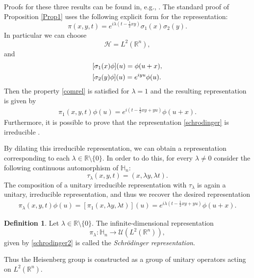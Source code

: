 \documentclass[12pt,oneside,a4paper]{book}
\numberwithin{equation}{section}     %
\theoremstyle{plain}
\theoremstyle{definition}
\newtheorem{definition}[theorem]{Definition}
\newcommand{\R}{{\mathbb R}}
\newcommand{\Rn}{{\R}^n}
\begin{document}
Proofs for these three results can be found in, e.g., \cite[Chapter VI]{R2001}. The standard proof of Proposition \ref{Prop1} uses the following explicit form for the representation:
\[
\pi(x,y,t)=e^{i\lambda (t-\frac{1}{2}x y)}\sigma_1(x)\sigma_2(y).
\]
In particular we can choose
\[
\mathcal{H}= L^2(\Rn),
\]
and
\begin{align}\notag
&[\sigma_1(x)\phi](u)=\phi(u+x),\\\notag
&[\sigma_2(y)\phi](u)=e^{i y u }\phi(u).
\end{align}
Then the property \eqref{comrel} is satisfied for $\lambda=1$ and the resulting representation is given by
\begin{align}\label{schrodinger}
\pi_1(x,y,t)\phi(u)=e^{i(t-\frac{1}{2}xy+yu)}\phi(u+x).
\end{align}
Furthermore, it is possible to prove that the representation \eqref{schrodinger} is irreducible \cite{T1998}.

By dilating this irreducible representation, we can obtain a representation corresponding to each $\lambda\in\R\setminus\{0\}$. In order to do this, for every $\lambda \ne 0$ consider the following continuous automorphism of $\mathbb{H}_n$:
\[
\tau_{\lambda}(x,y,t)=(x,\lambda y, \lambda t ).
\]   
The composition of a unitary irreducible representation with $\tau_\lambda$ is again a unitary, irreducible representation, and thus we recover the desired representation
\begin{align}\label{schrodinger2}
\pi_\lambda(x,y,t)\phi(u)=[\pi_1(x,\lambda y,\lambda t)](u)=e^{i\lambda(t-\frac{1}{2}xy+yu)}\phi(u+x).
\end{align}
\begin{definition}
	Let $\lambda\in\R\setminus\{0\}$. The infinite-dimensional representation
	\[
	\pi_\lambda:\mathbb{H}_n\rightarrow\mathcal{U}(L^2(\Rn)),
	\]
	given by \eqref{schrodinger2} is called the \textit{Schr\"odinger representation}.
\end{definition}
Thus the Heisenberg group is constructed as a group of unitary operators acting on $L^2(\Rn)$.
\end{document}
